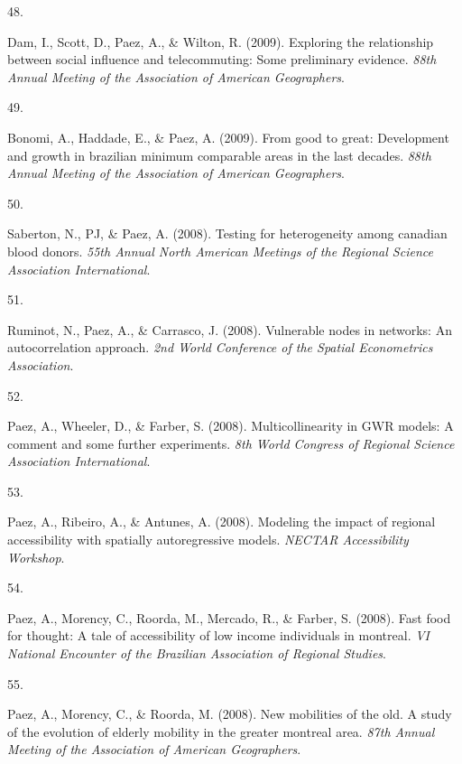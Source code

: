 \documentclass[10pt,a4paper,]{twentysecondcv}
\newlength{\csllabelwidth}
\newcommand{\CSLLeftMargin}[1]{\parbox[t]{\csllabelwidth}{#1}}
\newcommand{\CSLRightInline}[1]{\parbox[t]{\linewidth - \csllabelwidth}{#1}}
\begin{document}
\leavevmode{}%
\CSLLeftMargin{48. }%
\CSLRightInline{Dam, I., Scott, D., Paez, A., \& Wilton, R. (2009).
Exploring the relationship between social influence and telecommuting:
Some preliminary evidence. \emph{88th Annual Meeting of the Association
of American Geographers}.}

\leavevmode{}%
\CSLLeftMargin{49. }%
\CSLRightInline{Bonomi, A., Haddade, E., \& Paez, A. (2009). From good
to great: Development and growth in brazilian minimum comparable areas
in the last decades. \emph{88th Annual Meeting of the Association of
American Geographers}.}

\leavevmode{}%
\CSLLeftMargin{50. }%
\CSLRightInline{Saberton, N., PJ, \& Paez, A. (2008). Testing for
heterogeneity among canadian blood donors. \emph{55th Annual North
American Meetings of the Regional Science Association International}.}

\leavevmode{}%
\CSLLeftMargin{51. }%
\CSLRightInline{Ruminot, N., Paez, A., \& Carrasco, J. (2008).
Vulnerable nodes in networks: An autocorrelation approach. \emph{2nd
World Conference of the Spatial Econometrics Association}.}

\leavevmode{}%
\CSLLeftMargin{52. }%
\CSLRightInline{Paez, A., Wheeler, D., \& Farber, S. (2008).
Multicollinearity in GWR models: A comment and some further experiments.
\emph{8th World Congress of Regional Science Association
International}.}

\leavevmode{}%
\CSLLeftMargin{53. }%
\CSLRightInline{Paez, A., Ribeiro, A., \& Antunes, A. (2008). Modeling
the impact of regional accessibility with spatially autoregressive
models. \emph{NECTAR Accessibility Workshop}.}

\leavevmode{}%
\CSLLeftMargin{54. }%
\CSLRightInline{Paez, A., Morency, C., Roorda, M., Mercado, R., \&
Farber, S. (2008). Fast food for thought: A tale of accessibility of low
income individuals in montreal. \emph{VI National Encounter of the
Brazilian Association of Regional Studies}.}

\leavevmode{}%
\CSLLeftMargin{55. }%
\CSLRightInline{Paez, A., Morency, C., \& Roorda, M. (2008). New
mobilities of the old. A study of the evolution of elderly mobility in
the greater montreal area. \emph{87th Annual Meeting of the Association
of American Geographers}.}
\end{document}
